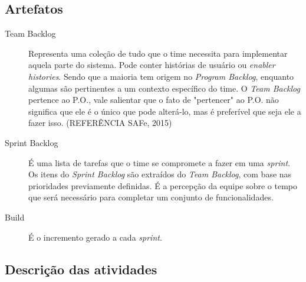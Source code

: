 \subsection{Artefatos}
\begin{description}
\item[Team Backlog] Representa uma coleção de tudo que o time necessita para implementar aquela parte do sistema. Pode conter histórias de usuário ou \textit{enabler histories}. Sendo que a maioria tem origem no \textit{Program Backlog}, enquanto algumas são pertinentes a um contexto específico do time. O \textit{Team Backlog} pertence ao P.O., vale salientar que o fato de "pertencer" ao P.O. não significa que ele é o único que pode alterá-lo, mas é preferível que seja ele a fazer isso. (REFERÊNCIA SAFe, 2015)
\item[Sprint Backlog] É uma lista de tarefas que o time se compromete a fazer em uma \textit{sprint}. Os itens do \textit{Sprint Backlog} são extraídos do \textit{Team Backlog}, com base nas prioridades previamente definidas. É a percepção da equipe sobre o tempo que será necessário para completar um conjunto de funcionalidades.
\item[Build] É o incremento gerado a cada \textit{sprint}.
\end{description}

\subsection{Descrição das atividades}
